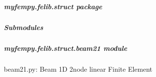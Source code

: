 \documentclass[letterpaper,10pt,english]{sphinxmanual}
\begin{document}
\subparagraph{myfempy.felib.struct package}
\label{\detokenize{myfempy.felib.struct:myfempy-felib-struct-package}}\label{\detokenize{myfempy.felib.struct::doc}}

\subparagraph{Submodules}
\label{\detokenize{myfempy.felib.struct:submodules}}

\subparagraph{myfempy.felib.struct.beam21 module}
\label{\detokenize{myfempy.felib.struct:module-myfempy.felib.struct.beam21}}\label{\detokenize{myfempy.felib.struct:myfempy-felib-struct-beam21-module}}
\sphinxAtStartPar
beam21.py: Beam 1D 2\sphinxhyphen{}node linear Finite Element
\end{document}
